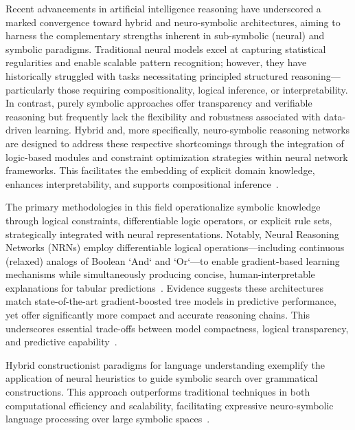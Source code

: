 \documentclass[sigconf]{acmart}
\begin{document}
Recent advancements in artificial intelligence reasoning have underscored a marked convergence toward hybrid and neuro-symbolic architectures, aiming to harness the complementary strengths inherent in sub-symbolic (neural) and symbolic paradigms. Traditional neural models excel at capturing statistical regularities and enable scalable pattern recognition; however, they have historically struggled with tasks necessitating principled structured reasoning—particularly those requiring compositionality, logical inference, or interpretability. In contrast, purely symbolic approaches offer transparency and verifiable reasoning but frequently lack the flexibility and robustness associated with data-driven learning. Hybrid and, more specifically, neuro-symbolic reasoning networks are designed to address these respective shortcomings through the integration of logic-based modules and constraint optimization strategies within neural network frameworks. This facilitates the embedding of explicit domain knowledge, enhances interpretability, and supports compositional inference~\cite{ref93,ref1,ref10,ref11,ref22,ref42,ref45,ref49,ref54,ref56,ref68,ref86}.

The primary methodologies in this field operationalize symbolic knowledge through logical constraints, differentiable logic operators, or explicit rule sets, strategically integrated with neural representations. Notably, Neural Reasoning Networks (NRNs) employ differentiable logical operations—including continuous (relaxed) analogs of Boolean `And` and `Or`—to enable gradient-based learning mechanisms while simultaneously producing concise, human-interpretable explanations for tabular predictions~\cite{ref93}. Evidence suggests these architectures match state-of-the-art gradient-boosted tree models in predictive performance, yet offer significantly more compact and accurate reasoning chains. This underscores essential trade-offs between model compactness, logical transparency, and predictive capability~\cite{ref93,ref49}.

Hybrid constructionist paradigms for language understanding exemplify the application of neural heuristics to guide symbolic search over grammatical constructions. This approach outperforms traditional techniques in both computational efficiency and scalability, facilitating expressive neuro-symbolic language processing over large symbolic spaces~\cite{ref54}.
\end{document}
